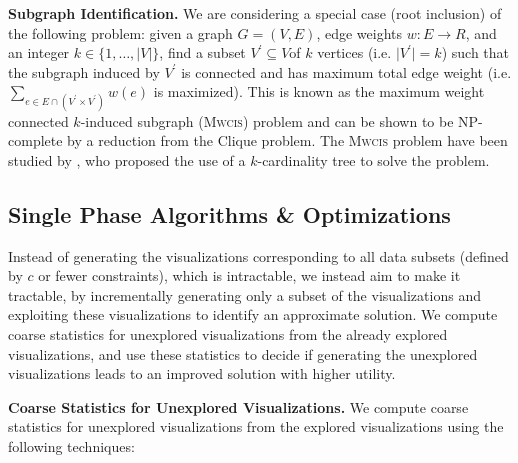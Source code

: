 \textbf{Subgraph Identification.} We are considering a special case (root inclusion) of the following problem: given a graph $G=(V,E)$, edge weights $w:E\rightarrow R$, and an integer $k\in\{1,\ldots,\lvert V\rvert\}$, find a subset $V^\prime \subseteq V $of $k$ vertices (i.e. $\lvert V^\prime\rvert = k$) such that the subgraph induced by $V^\prime$  is connected and has maximum total edge weight (i.e. $\sum_{e\in E\cap(V^\prime\times V^\prime)}w(e)$ is maximized). This is known as the maximum weight connected $k$-induced subgraph (\textsc{Mwcis}) problem and can be shown to be NP-complete by a reduction from the Clique problem. The \textsc{Mwcis} problem have been studied by \cite{ErnstAlthaus2009}, who proposed the use of a $k$-cardinality tree to solve the problem.



\subsection{Single Phase Algorithms \& Optimizations}
Instead of generating the visualizations corresponding to all data subsets (defined by $c$ or fewer constraints), which is intractable, we instead aim to make it tractable, by incrementally generating only a subset of the visualizations and exploiting these visualizations to identify an approximate solution. We compute coarse statistics for unexplored visualizations from the already explored visualizations, and use these statistics to decide if generating the unexplored visualizations leads to an improved solution with higher utility.

\textbf{Coarse Statistics for Unexplored Visualizations.} We compute coarse statistics for unexplored visualizations from the explored visualizations using the following techniques:

